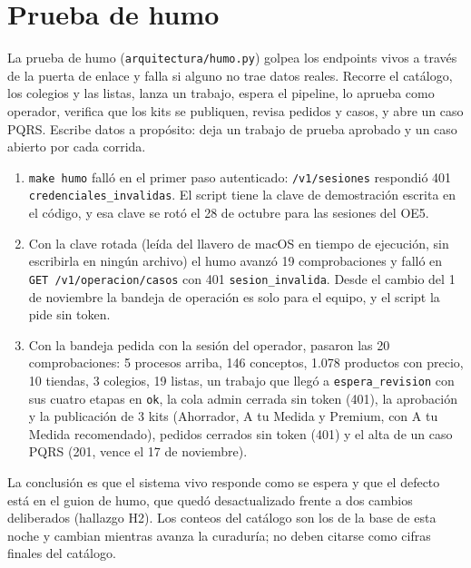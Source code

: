 \documentclass[11pt,letterpaper]{article}
\newcommand{\ruta}[1]{\texttt{\small #1}}
\begin{document}
\section{Prueba de humo}

La prueba de humo (\ruta{arquitectura/\allowbreak{}humo.py}) golpea los endpoints vivos a través de la puerta de enlace y
falla si alguno no trae datos reales. Recorre el catálogo, los colegios y las listas, lanza un trabajo,
espera el pipeline, lo aprueba como operador, verifica que los kits se publiquen, revisa pedidos y casos, y
abre un caso PQRS. Escribe datos a propósito: deja un trabajo de prueba aprobado y un caso abierto por cada
corrida.

\begin{enumerate}
  \item \ruta{make humo} falló en el primer paso autenticado: \ruta{/\allowbreak{}v1/\allowbreak{}sesiones} respondió 401
        \ruta{credenciales\_\allowbreak{}invalidas}. El script tiene la clave de demostración escrita en el código, y esa
        clave se rotó el 28 de octubre para las sesiones del OE5.
  \item Con la clave rotada (leída del llavero de macOS en tiempo de ejecución, sin escribirla en ningún
        archivo) el humo avanzó 19 comprobaciones y falló en \ruta{GET /\allowbreak{}v1/\allowbreak{}operacion/\allowbreak{}casos} con 401
        \ruta{sesion\_\allowbreak{}invalida}. Desde el cambio del 1 de noviembre la bandeja de operación es solo para el
        equipo, y el script la pide sin token.
  \item Con la bandeja pedida con la sesión del operador, pasaron las 20 comprobaciones: 5 procesos arriba,
        146 conceptos, 1.078 productos con precio, 10 tiendas, 3 colegios, 19 listas, un trabajo que llegó a
        \ruta{espera\_\allowbreak{}revision} con sus cuatro etapas en \ruta{ok}, la cola admin cerrada sin token (401),
        la aprobación y la publicación de 3 kits (Ahorrador, A tu Medida y Premium, con A tu Medida
        recomendado), pedidos cerrados sin token (401) y el alta de un caso PQRS (201, vence el 17 de
        noviembre).
\end{enumerate}

La conclusión es que el sistema vivo responde como se espera y que el defecto está en el guion de humo, que
quedó desactualizado frente a dos cambios deliberados (hallazgo H2). Los conteos del catálogo son los de la
base de esta noche y cambian mientras avanza la curaduría; no deben citarse como cifras finales del catálogo.
\end{document}
